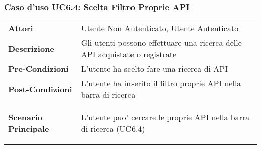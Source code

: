 \subsubsection{Caso d'uso UC6.4:  Scelta Filtro Proprie API}
\label{UC6_4}

\begin{tabular}{ l | p{11cm}}
	\hline
	\rowcolor{Gray}
	 \multicolumn{2}{c}{UC6.4 - Scelta Filtro Proprie API} \\
	 \hline
	\textbf{Attori} & Utente Non Autenticato, Utente Autenticato \\
	\textbf{Descrizione} & Gli utenti possono effettuare una ricerca delle API acquistate o registrate\\
	\textbf{Pre-Condizioni} & L'utente ha scelto fare una ricerca di API\\
	\textbf{Post-Condizioni} & L'utente ha inserito il filtro proprie API nella barra di ricerca \\
	\textbf{Scenario Principale} & 
	\begin{enumerate*}[label=(\arabic*.),itemjoin={\newline}]
		\item L'utente puo' cercare le proprie API nella barra di ricerca (UC6.4)
	\end{enumerate*}\\
\end{tabular}